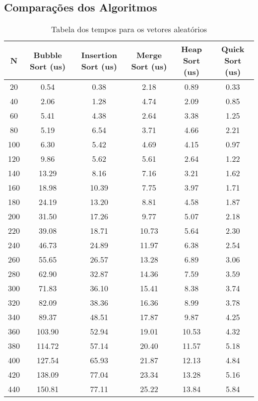 \documentclass[10pt,a4paper]{report}
\begin{document}
\begin{samepage}
\section{Comparações dos Algoritmos}
\begin{table}[H]\small
\caption{Tabela dos tempos para os vetores aleatórios}
\begin{center}
\begin{tabular}{|c|c|c|c|c|c|}
\hline 
N & Bubble Sort (us) & Insertion Sort (us) & Merge Sort (us) & Heap Sort (us) & Quick Sort (us) \\ 
\hline
20 & 0.54 & 0.38 & 2.18 & 0.89 & 0.33 \\
\hline
40 & 2.06 & 1.28 & 4.74 & 2.09 & 0.85 \\
\hline
60 & 5.41 & 4.38 & 2.64 & 3.38 & 1.25 \\
\hline
80 & 5.19 & 6.54 & 3.71 & 4.66 & 2.21 \\
\hline
100 & 6.30 & 5.42 & 4.69 & 4.15 & 0.97 \\
\hline
120 & 9.86 & 5.62 & 5.61 & 2.64 & 1.22 \\
\hline
140 & 13.29 & 8.16 & 7.16 & 3.21 & 1.62 \\
\hline
160 & 18.98 & 10.39 & 7.75 & 3.97 & 1.71 \\
\hline
180 & 24.19 & 13.20 & 8.81 & 4.58 & 1.87 \\
\hline
200 & 31.50 & 17.26 & 9.77 & 5.07 & 2.18 \\
\hline
220 & 39.08 & 18.71 & 10.73 & 5.64 & 2.30 \\
\hline
240 & 46.73 & 24.89 & 11.97 & 6.38 & 2.54 \\
\hline
260 & 55.65 & 26.57 & 13.28 & 6.89 & 3.06 \\
\hline
280 & 62.90 & 32.87 & 14.36 & 7.59 & 3.59 \\
\hline
300 & 71.83 & 36.10 & 15.41 & 8.38 & 3.74 \\
\hline
320 & 82.09 & 38.36 & 16.36 & 8.99 & 3.78 \\
\hline
340 & 89.37 & 48.51 & 17.87 & 9.87 & 4.25 \\
\hline
360 & 103.90 & 52.94 & 19.01 & 10.53 & 4.32 \\
\hline
380 & 114.72 & 57.14 & 20.40 & 11.57 & 5.18 \\
\hline
400 & 127.54 & 65.93 & 21.87 & 12.13 & 4.84 \\
\hline
420 & 138.09 & 77.04 & 23.34 & 13.28 & 5.16 \\
\hline
440 & 150.81 & 77.11 & 25.22 & 13.84 & 5.84 \\

\end{tabular}
\end{center}
\end{table}
\end{samepage}
\end{document}
